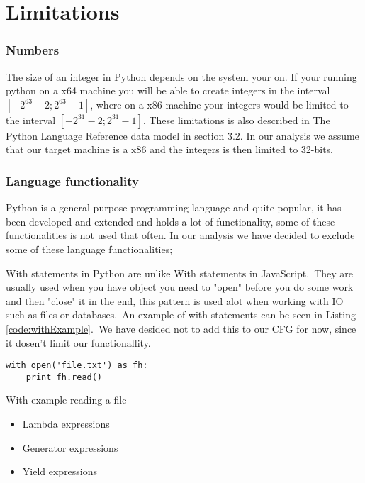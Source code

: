 \chapter{Limitations}

\subsection{Numbers}
The size of an integer in Python depends on the system your on. If your running python on a x64 machine you will be able to create integers in the interval $[-2^{63}-2;2^{63}-1]$, where on a x86 machine your integers would be limited to the interval $[-2^{31}-2;2^{31}-1]$. These limitations is also described in The Python Language Reference data model\cite{pyref.datamodel} in section 3.2. In our analysis we assume that our target machine is a x86 and the integers is then limited to 32-bits.

\subsection{Language functionality}
Python is a general purpose programming language and quite popular, it has been developed and extended and holds a lot of functionality, some of these functionalities is not used that often. In our analysis we have decided to exclude some of these language functionalities;

With statements in Python are unlike With statements in JavaScript.\ They are usually used when you have object you need to "open" before you do some work and then "close" it in the end, this pattern is used alot when working with IO such as files or databases.\ An example of with statements can be seen in Listing \ref{code:withExample}.\ We have desided not to add this to our CFG for now, since it dosen't limit our functionallity.

\begin{listing}[H]
	\begin{verbatim}
with open('file.txt') as fh:
	print fh.read()
	\end{verbatim}
	\caption{With example reading a file}\label{code:withExample}
\end{listing}

\begin{itemize}
	\item Lambda expressions
	\item Generator expressions
	\item Yield expressions
\end{itemize}

